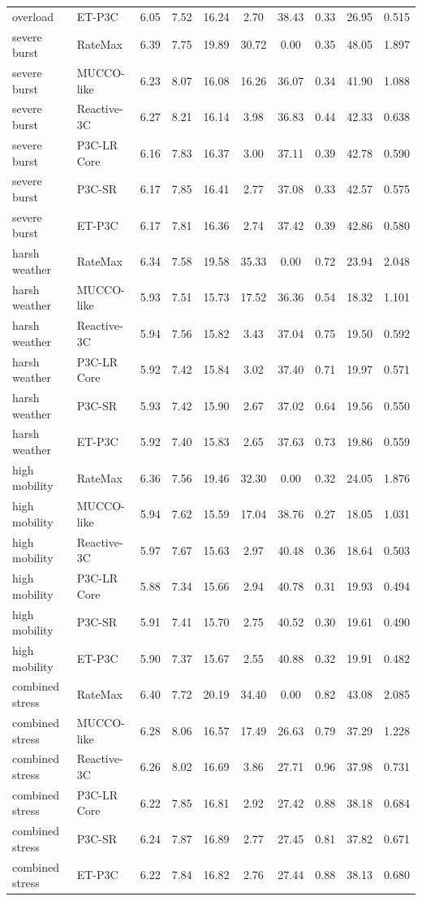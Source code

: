 \begin{table}[!t]
\begin{tabular}{llcccccccc}
overload & ET-P3C & 6.05 & 7.52 & 16.24 & 2.70 & 38.43 & 0.33 & 26.95 & 0.515 \\
severe burst & RateMax & 6.39 & 7.75 & 19.89 & 30.72 & 0.00 & 0.35 & 48.05 & 1.897 \\
severe burst & MUCCO-like & 6.23 & 8.07 & 16.08 & 16.26 & 36.07 & 0.34 & 41.90 & 1.088 \\
severe burst & Reactive-3C & 6.27 & 8.21 & 16.14 & 3.98 & 36.83 & 0.44 & 42.33 & 0.638 \\
severe burst & P3C-LR Core & 6.16 & 7.83 & 16.37 & 3.00 & 37.11 & 0.39 & 42.78 & 0.590 \\
severe burst & P3C-SR & 6.17 & 7.85 & 16.41 & 2.77 & 37.08 & 0.33 & 42.57 & 0.575 \\
severe burst & ET-P3C & 6.17 & 7.81 & 16.36 & 2.74 & 37.42 & 0.39 & 42.86 & 0.580 \\
harsh weather & RateMax & 6.34 & 7.58 & 19.58 & 35.33 & 0.00 & 0.72 & 23.94 & 2.048 \\
harsh weather & MUCCO-like & 5.93 & 7.51 & 15.73 & 17.52 & 36.36 & 0.54 & 18.32 & 1.101 \\
harsh weather & Reactive-3C & 5.94 & 7.56 & 15.82 & 3.43 & 37.04 & 0.75 & 19.50 & 0.592 \\
harsh weather & P3C-LR Core & 5.92 & 7.42 & 15.84 & 3.02 & 37.40 & 0.71 & 19.97 & 0.571 \\
harsh weather & P3C-SR & 5.93 & 7.42 & 15.90 & 2.67 & 37.02 & 0.64 & 19.56 & 0.550 \\
harsh weather & ET-P3C & 5.92 & 7.40 & 15.83 & 2.65 & 37.63 & 0.73 & 19.86 & 0.559 \\
high mobility & RateMax & 6.36 & 7.56 & 19.46 & 32.30 & 0.00 & 0.32 & 24.05 & 1.876 \\
high mobility & MUCCO-like & 5.94 & 7.62 & 15.59 & 17.04 & 38.76 & 0.27 & 18.05 & 1.031 \\
high mobility & Reactive-3C & 5.97 & 7.67 & 15.63 & 2.97 & 40.48 & 0.36 & 18.64 & 0.503 \\
high mobility & P3C-LR Core & 5.88 & 7.34 & 15.66 & 2.94 & 40.78 & 0.31 & 19.93 & 0.494 \\
high mobility & P3C-SR & 5.91 & 7.41 & 15.70 & 2.75 & 40.52 & 0.30 & 19.61 & 0.490 \\
high mobility & ET-P3C & 5.90 & 7.37 & 15.67 & 2.55 & 40.88 & 0.32 & 19.91 & 0.482 \\
combined stress & RateMax & 6.40 & 7.72 & 20.19 & 34.40 & 0.00 & 0.82 & 43.08 & 2.085 \\
combined stress & MUCCO-like & 6.28 & 8.06 & 16.57 & 17.49 & 26.63 & 0.79 & 37.29 & 1.228 \\
combined stress & Reactive-3C & 6.26 & 8.02 & 16.69 & 3.86 & 27.71 & 0.96 & 37.98 & 0.731 \\
combined stress & P3C-LR Core & 6.22 & 7.85 & 16.81 & 2.92 & 27.42 & 0.88 & 38.18 & 0.684 \\
combined stress & P3C-SR & 6.24 & 7.87 & 16.89 & 2.77 & 27.45 & 0.81 & 37.82 & 0.671 \\
combined stress & ET-P3C & 6.22 & 7.84 & 16.82 & 2.76 & 27.44 & 0.88 & 38.13 & 0.680 \\
\bottomrule
\end{tabular}
\end{table}

